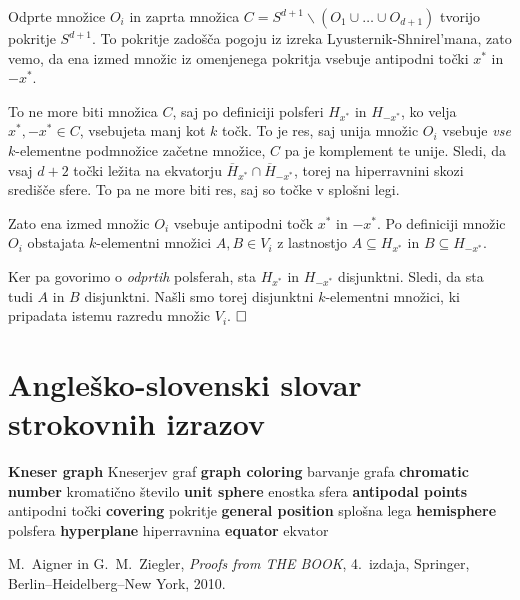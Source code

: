 \documentclass[a4paper,12pt]{article}
\newcommand{\geslo}[2]{\textbf{#1} \quad #2\newline}
\def\qed{$\hfill\Box$}   %
\begin{document}
Odprte množice $O_i$ in zaprta množica $C = S^{d+1} \backslash (O_1 \cup \ldots \cup O_{d+1})$ tvorijo pokritje $S^{d+1}$. To pokritje zadošča pogoju iz izreka Lyusternik-Shnirel'mana, zato vemo, da ena izmed množic iz omenjenega pokritja vsebuje antipodni točki $x^*$ in $-x^*$. 

To ne more biti množica $C$, saj po definiciji polsferi $H_{x^*}$ in $H_{-x^*}$, ko velja $x^*, -x^* \in C$, vsebujeta manj kot $k$ točk. To je res, saj unija množic $O_i$ vsebuje {\em vse} $k$-elementne podmnožice začetne množice, $C$ pa je komplement te unije. Sledi, da vsaj $d+2$ točki ležita na ekvatorju $\overline H_{x^*} \cap \overline H_{-x^*}$, torej na hiperravnini skozi središče sfere. To pa ne more biti res, saj so točke v splošni legi.

Zato ena izmed množic $O_i$ vsebuje antipodni točk $x^*$ in $-x^*$. Po definiciji množic $O_i$  obstajata \mbox{$k$-elementni} množici $A, B \in V_i$ z lastnostjo $A \subseteq H_{x^*}$ in $B \subseteq H_{-x^*}$. 

Ker pa govorimo o {\em odprtih} polsferah, sta $H_{x^*}$ in $H_{-x^*}$ disjunktni. Sledi, da sta tudi $A$ in $B$ disjunktni. Našli smo torej disjunktni $k$-elementni množici, ki pripadata istemu razredu množic $V_i$. \qed


\newpage

\section*{Angleško-slovenski slovar strokovnih izrazov}

\geslo{Kneser graph}{Kneserjev graf}
\geslo{graph coloring}{barvanje grafa}
\geslo{chromatic number}{kromatično število}
\geslo{unit sphere}{enostka sfera}
\geslo{antipodal points}{antipodni točki}
\geslo{covering}{pokritje}
\geslo{general position}{splošna lega}
\geslo{hemisphere}{polsfera}
\geslo{hyperplane}{hiperravnina}
\geslo{equator}{ekvator}

\begin{thebibliography}{1}

M.~Aigner in G.~M.~Ziegler, \emph{Proofs from THE BOOK}, 4.\ izdaja, Springer, Berlin--Heidelberg--New York, 2010.

\end{thebibliography}
\end{document}
